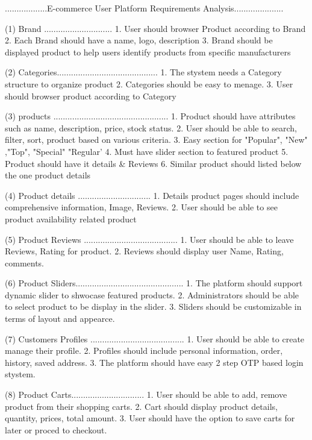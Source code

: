 ..................E-commerce User Platform Requirements Analysis.....................

(1) Brand .............................
    1. User should browser Product according to Brand
    2. Each Brand should have a name, logo, description
    3. Brand should be displayed product to help users identify products from specific manufacturers

(2) Categories...........................................
    1. The stystem needs a Category structure to organize product
    2. Categories should be easy to menage.
    3. User should browser product according to Category

(3) products .................................................
    1. Product should have attributes such as name, description, price, stock status.
    2. User should be able to search, filter, sort, product based on various criteria.
    3. Easy section for "Popular", "New" ,"Top", "Special" "Regular'
    4. Must have slider section to featured product 
    5. Product should have it details & Reviews
    6. Similar product should listed below the one product details

(4) Product details ...............................
    1. Details product pages should include comprehensive information, Image, Reviews.
    2. User should be able to see product availability related product

(5) Product Reviews ........................................
    1. User should be able to leave Reviews, Rating for product.
    2. Reviews should display user Name, Rating, comments.

(6) Product Sliders..............................................
    1. The platform should support dynamic slider to shwocase featured products.
    2. Administrators should be able to select product to be display in the slider.
    3. Sliders should be customizable in terms of layout and appearce.

(7) Customers Profiles ........................................
    1. User should be able to create manage their profile.
    2. Profiles should include personal information, order, history, saved address.
    3. The platform should have easy 2 step OTP based login stystem.

(8) Product Carts...............................
    1. User should be able to add, remove product from their shopping carts.
    2. Cart should display product details, quantity, prices, total amount.
    3. User should have the option to save carts for later or proced to checkout.

